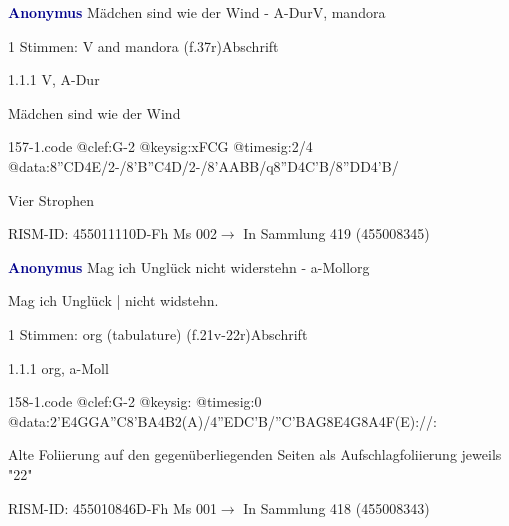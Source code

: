 \documentclass[twocolumn]{book}
\begin{document}
\par \vspace{7pt} \textcolor{darkblue}{\textbf{Anonymus  }}\hfillplus{\textbf{[157]}}\newline Mädchen sind wie der Wind - A-Dur\newline V, mandora
\par \begin{itshape}\end{itshape} 
\par \textcolor{darkblue}{}  1 Stimmen: V and mandora  (f.37r)\newline Abschrift
\par 1.1.1  V, A-Dur\newline \begin{footnotesize} Mädchen sind wie der Wind \end{footnotesize}  
\begin{filecontents*}{157-1.code}
@clef:G-2
@keysig:xFCG
@timesig:2/4
@data:8''CD4E/2-/8'B''C4D/2-/8'AABB/q8''D4C'B/8''DD4'B/
\end{filecontents*}
\newline
%
\par Vier Strophen
\par RISM-ID: 455011110\newline D-Fh  Ms 002\newline $\rightarrow$ In Sammlung 419 (455008345)
      
\par \vspace{7pt} \textcolor{darkblue}{\textbf{Anonymus  }}\hfillplus{\textbf{[158]}}\newline Mag ich Unglück nicht widerstehn - a-Moll\newline org
\par \begin{itshape}[f.21v, at left:] Mag ich Unglück | nicht widstehn.\end{itshape} 
\par \textcolor{darkblue}{}  1 Stimmen: org (tabulature)  (f.21v-22r)\newline Abschrift
\par 1.1.1  org, a-Moll  
\begin{filecontents*}{158-1.code}
@clef:G-2
@keysig:
@timesig:0
@data:2'E4GGA''C{8'BA}4B2(A)/4''EDC'B/''C'BAG8E4G8A4F(E)://:
\end{filecontents*}
\newline
%
\par Alte Foliierung auf den gegenüberliegenden Seiten als Aufschlagfoliierung jeweils "22"
\par RISM-ID: 455010846\newline D-Fh  Ms 001\newline $\rightarrow$ In Sammlung 418 (455008343)
      
\end{document}

